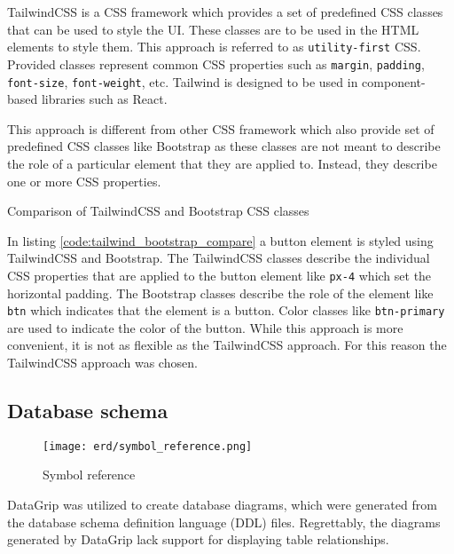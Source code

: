 \documentclass[../main.tex]{subfiles}
\begin{document}
TailwindCSS is a CSS framework which provides a set of predefined CSS classes that can be used to style the UI.
These classes are to be used in the HTML elements to style them. This approach is referred to as \texttt{utility-first} CSS.
Provided classes represent common CSS properties such as \texttt{margin}, \texttt{padding}, \texttt{font-size}, \texttt{font-weight}, etc.
Tailwind is designed to be used in component-based libraries such as React.

This approach is different from other CSS framework which also provide set of predefined CSS classes like Bootstrap \cite{bootstrap}
as these classes are not meant to describe the role of a particular element that they are applied to. Instead, they describe one or more CSS properties.

\begin{listing}[H]
  \caption{Comparison of TailwindCSS and Bootstrap CSS classes}
  \label{code:tailwind_bootstrap_compare}
\end{listing}

In listing \ref{code:tailwind_bootstrap_compare} a button element is styled using TailwindCSS and Bootstrap.
The TailwindCSS classes describe the individual CSS properties that are applied to the button element like
\texttt{px-4} which set the horizontal padding. The Bootstrap classes describe the role of the element like \texttt{btn} which
indicates that the element is a button. Color classes like \texttt{btn-primary} are used to indicate the color of the button.
While this approach is more convenient, it is not as flexible as the TailwindCSS approach. For this reason the TailwindCSS approach was chosen.



\subsection{Database schema}

\begin{figure}[H]
  \centering
  \texttt{[image: erd/symbol\_reference.png]}
  \caption{Symbol reference \cite{datagrip-diagrams-icons}}
\end{figure}


DataGrip \cite{datagrip} was utilized to create database diagrams, which were generated from the database schema definition language (DDL) files.
Regrettably, the diagrams generated by DataGrip lack support for displaying table relationships.
\end{document}
